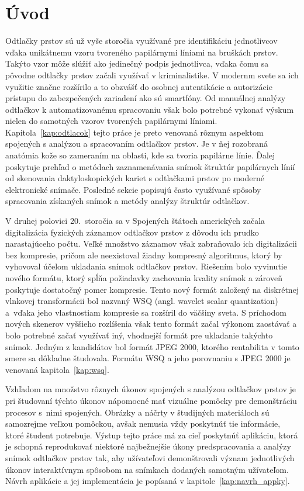 \chapter{Úvod}
  Odtlačky prstov sú už vyše storočia využívané pre identifikáciu jednotlivcov vďaka unikátnemu vzoru tvoreného papilárnymi líniami na bruškách prstov.
  Takýto vzor môže slúžiť ako jedinečný podpis jednotlivca, vďaka čomu sa pôvodne odtlačky prstov začali využívať v kriminalistike. V modernm svete sa ich
  využitie značne rozšírilo a to obzvášť do osobnej autentikácie a autorizácie prístupu do zabezpečených zariadení ako sú smartfóny. Od manuálnej analýzy
  odtlačkov k automatizovanému spracovaniu však bolo potrebné vykonať výskum nielen do samotných vzorov tvorených papilárnymi líniami.
  Kapitola~{\ref{kap:odtlacok}} tejto práce je preto venovaná rôznym aspektom spojených s analýzou a spracovaním odtlačkov prstov. Je v ňej rozobraná anatómia
  kože so zameraním na oblasti, kde sa tvoria papilárne línie. Ďalej poskytuje prehľad o metódach zaznamenávania snímok štruktúr papilárnych línií od
  skenovania daktyloskopických kariet s odtlačkami prstov po moderné elektronické snímače. Posledné sekcie popisujú často využívané spôsoby spracovania
  získaných snímok a metódy analýzy štruktúr odtlačkov.

  V druhej polovici 20.~storočia sa v Spojených štátoch amerických začala digitalizácia fyzických záznamov odtlačkov prstov z dôvodu ich prudko narastajúceho
  počtu. Veľké množstvo záznamov však zabraňovalo ich digitalizácii bez kompresie, pričom ale neexistoval žiadny kompresný algoritmus, ktorý by vyhovoval
  účelom ukladania snímok odtlačkov prstov. Riešením bolo vyvinutie nového formátu, ktorý spĺňa požiadavky zachovania kvality snímok a zároveň poskytuje
  dostatočný pomer kompresie. Tento nový formát založený na diskrétnej vlnkovej transformácii bol nazvaný WSQ (angl. wavelet scalar quantization) a~vďaka
  jeho vlastnostiam kompresie sa rozšíril do väčšiny sveta. S príchodom nových skenerov vyššieho rozlíšenia však tento formát začal výkonom zaostávať a
  bolo potrebné začať využívať iný, vhodnejší formát pre ukladanie takýchto snímok. Jedným z kandidátov bol formát JPEG 2000, ktorého rentabilita v tomto smere
  sa dôkladne študovala. Formátu WSQ a jeho porovnaniu s JPEG 2000 je venovaná kapitola~{\ref{kap:wsq}}.

  Vzhľadom na množstvo rôznych úkonov spojených s analýzou odtlačkov prstov je pri študovaní týchto úkonov nápomocné mať vizuálne pomôcky
  pre demonštráciu procesov s~nimi spojených. Obrázky a náčrty v študijných materiáloch sú samozrejme veľkou pomôckou, avšak nemusia vždy
  poskytnúť tie informácie, ktoré študent potrebuje. Výstup tejto práce má za cieľ poskytnúť aplikáciu, ktorá je schopná reprodukovať
  niektoré najbežnejšie úkony predspracovania a analýzy snímok odtlačkov prstov tak, aby užívateľovi demonštrovali význam jednotlivých úkonov
  interaktívnym spôsobom na snímkach dodaných samotným užívateľom. Návrh aplikácie a jej implementácia je popísaná v kapitole~{\ref{kap:navrh_appky}}.

